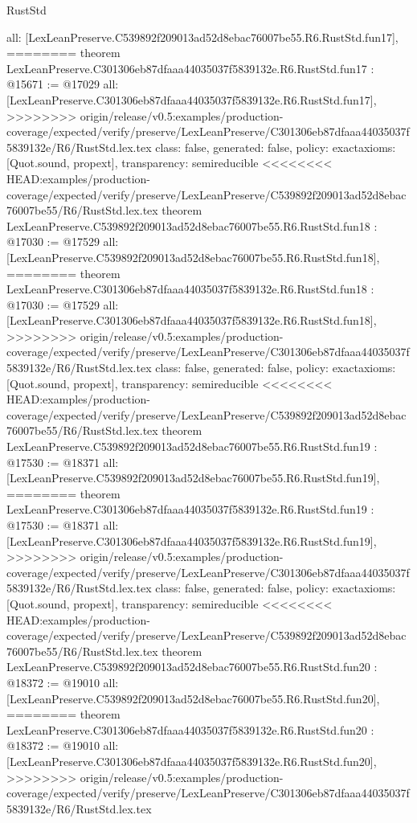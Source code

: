 \begin{lexlean}{RustStd}
\begin{coremodule}
{\begin{coremodule}
{{{{{{{{{{{{{{{{{{{{  all: [LexLeanPreserve.C539892f209013ad52d8ebac76007be55.R6.RustStd.fun17],
========
theorem LexLeanPreserve.C301306eb87dfaaa44035037f5839132e.R6.RustStd.fun17 : @15671 := @17029 {
  all: [LexLeanPreserve.C301306eb87dfaaa44035037f5839132e.R6.RustStd.fun17],
>>>>>>>> origin/release/v0.5:examples/production-coverage/expected/verify/preserve/LexLeanPreserve/C301306eb87dfaaa44035037f5839132e/R6/RustStd.lex.tex
  class: false,
  generated: false,
  policy: exact{axioms: [Quot.sound, propext]},
  transparency: semireducible
}
<<<<<<<< HEAD:examples/production-coverage/expected/verify/preserve/LexLeanPreserve/C539892f209013ad52d8ebac76007be55/R6/RustStd.lex.tex
theorem LexLeanPreserve.C539892f209013ad52d8ebac76007be55.R6.RustStd.fun18 : @17030 := @17529 {
  all: [LexLeanPreserve.C539892f209013ad52d8ebac76007be55.R6.RustStd.fun18],
========
theorem LexLeanPreserve.C301306eb87dfaaa44035037f5839132e.R6.RustStd.fun18 : @17030 := @17529 {
  all: [LexLeanPreserve.C301306eb87dfaaa44035037f5839132e.R6.RustStd.fun18],
>>>>>>>> origin/release/v0.5:examples/production-coverage/expected/verify/preserve/LexLeanPreserve/C301306eb87dfaaa44035037f5839132e/R6/RustStd.lex.tex
  class: false,
  generated: false,
  policy: exact{axioms: [Quot.sound, propext]},
  transparency: semireducible
}
<<<<<<<< HEAD:examples/production-coverage/expected/verify/preserve/LexLeanPreserve/C539892f209013ad52d8ebac76007be55/R6/RustStd.lex.tex
theorem LexLeanPreserve.C539892f209013ad52d8ebac76007be55.R6.RustStd.fun19 : @17530 := @18371 {
  all: [LexLeanPreserve.C539892f209013ad52d8ebac76007be55.R6.RustStd.fun19],
========
theorem LexLeanPreserve.C301306eb87dfaaa44035037f5839132e.R6.RustStd.fun19 : @17530 := @18371 {
  all: [LexLeanPreserve.C301306eb87dfaaa44035037f5839132e.R6.RustStd.fun19],
>>>>>>>> origin/release/v0.5:examples/production-coverage/expected/verify/preserve/LexLeanPreserve/C301306eb87dfaaa44035037f5839132e/R6/RustStd.lex.tex
  class: false,
  generated: false,
  policy: exact{axioms: [Quot.sound, propext]},
  transparency: semireducible
}
<<<<<<<< HEAD:examples/production-coverage/expected/verify/preserve/LexLeanPreserve/C539892f209013ad52d8ebac76007be55/R6/RustStd.lex.tex
theorem LexLeanPreserve.C539892f209013ad52d8ebac76007be55.R6.RustStd.fun20 : @18372 := @19010 {
  all: [LexLeanPreserve.C539892f209013ad52d8ebac76007be55.R6.RustStd.fun20],
========
theorem LexLeanPreserve.C301306eb87dfaaa44035037f5839132e.R6.RustStd.fun20 : @18372 := @19010 {
  all: [LexLeanPreserve.C301306eb87dfaaa44035037f5839132e.R6.RustStd.fun20],
>>>>>>>> origin/release/v0.5:examples/production-coverage/expected/verify/preserve/LexLeanPreserve/C301306eb87dfaaa44035037f5839132e/R6/RustStd.lex.tex
}}}}}}}}}}}}}}}}}}}}}}}}
\end{coremodule}}
\end{coremodule}
\end{lexlean}
